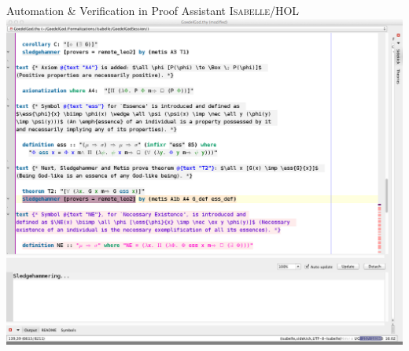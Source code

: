 \begin{frame}{Automation \& Verification in Proof Assistant
    \textsc{Isabelle/HOL}} \large
\colorbox{gray}{\includegraphics[width=.92\textwidth]{IsabelleDemoGrab}} 
\end{frame}